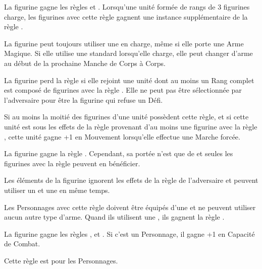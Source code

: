 \armyspecialruleentry{\lanceformation}

La figurine gagne les règles \monstrousranks{} et \fightinextrarank{}. Lorsqu'une unité formée de rangs de 3 figurines charge, les figurines avec cette règle gagnent une instance supplémentaire de la règle \fightinextrarank{}. 

\armyspecialruleentry{\jousting}

La figurine peut toujours utiliser une \lance{} en charge, même si elle porte une Arme Magique. Si elle utilise une \lance{} standard lorsqu'elle charge, elle peut changer d'arme au début de la prochaine Manche de Corps à Corps.

\armyspecialruleentry{\beloved}

La figurine perd la règle \firstinrank{} si elle rejoint une unité dont au moins un Rang complet est composé de figurines avec la règle \lanceformation{}. Elle ne peut pas être sélectionnée par l'adversaire pour être la figurine qui refuse un Défi.

\armyspecialruleentry{\serfs}

Si au moins la moitié des figurines d'une unité possèdent cette règle, et si cette unité est sous les effets de la règle \inspiringpresence{} provenant d'au moins une figurine avec la règle \oathoffealty{}, cette unité gagne +1 en Mouvement lorsqu'elle effectue une Marche forcée.

\armyspecialruleentry{\oathoffealty}

La figurine gagne la règle \inspiringpresence{}. Cependant, sa portée n'est que de  et seules les figurines avec la règle \serfs{} peuvent en bénéficier.

\setlength{\columnseprule}{0.5pt}
\renewcommand{\columnseprulecolor}{\color{black!30}}
\begin{multicols}{2}\raggedcolumns
\armyspecialruleentry{\questingoath}

Les éléments de la figurine ignorent les effets de la règle \fear{} de l'adversaire et peuvent utiliser un \shield{} et une \gw{} en même temps.

\vspace*{5pt}
Les Personnages avec cette règle doivent être équipés d'une \gw{} et ne peuvent utiliser aucun autre type d'arme. Quand ils utilisent une \gw{}, ils gagnent la règle .

\columnbreak
\armyspecialruleentry{\grailoath}

La figurine gagne les règles \magicalattacks{}, \immunetopsychology{} et . Si c'est un Personnage, il gagne +1 en Capacité de Combat.

\vspace*{5pt}
Cette règle est \oneofakind{} pour les Personnages.
\end{multicols}
\setlength{\columnseprule}{0pt}

